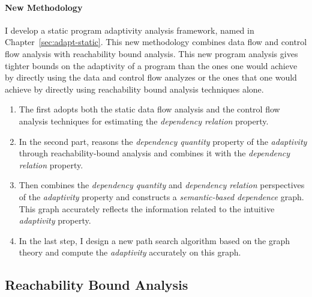 \paragraph{New Methodology}
I develop a static program adaptivity analysis framework, named {\THESYSTEM} in Chapter~\ref{sec:adapt-static}.
This new methodology combines data flow and control flow analysis with reachability bound analysis.
This new program analysis gives tighter bounds on the adaptivity of a program than the ones one would achieve 
by directly using the data and control flow analyzes or the ones that one would achieve 
by directly using reachability bound analysis techniques alone. 
\begin{enumerate}
\item The {\THESYSTEM} first adopts both the static data flow analysis and the control flow analysis techniques for
estimating the \emph{dependency relation} property.
\item In the second part, {\THESYSTEM} reasons the
\emph{dependency quantity} property of the \emph{adaptivity} through reachability-bound analysis and combines it with the
\emph{dependency relation} property.

\item Then
{\THESYSTEM} combines the \emph{dependency quantity} and \emph{dependency relation}
perspectives of the \emph{adaptivity} property
and constructs a \emph{semantic-based dependence} graph. This graph accurately reflects the information related to the intuitive \emph{adaptivity} property.
%
\item In the last step, I design a new path search algorithm based on the graph theory 
and compute the \emph{adaptivity} accurately on this graph.
\end{enumerate}

\subsection{Reachability Bound Analysis}
\label{sec:intro-methodology-reachability}
